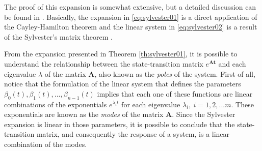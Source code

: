 \documentclass[a4paper,11pt]{book}
\numberwithin{figure}{chapter}
\numberwithin{equation}{chapter}
\numberwithin{table}{chapter}
\theoremstyle{definition}
\begin{document}
The proof of this expansion is somewhat extensive, but a detailed discussion can be found in \cite{Chen:1998}. Basically, the expansion in \eqref{eq:sylvester01} is a direct application of the Cayley-Hamilton theorem \cite{Atiyah:2018} and the linear system in \eqref{eq:sylvester02} is a result of the Sylvester's matrix theorem \cite{Horn:2012}.

From the expansion presented in Theorem \ref{th:sylvester01}, it is possible to understand the relationship between the state-transition matrix $e^{\bm{At}}$ and each eigenvalue $\lambda$ of the matrix $\bm{A}$, also known as the \textit{poles} of the system. First of all, notice that the formulation of the linear system that defines the parameters $\beta_0(t), \beta_1(t), ..., \beta_{n-1}(t)$ implies that each one of these functions are linear combinations of the exponentials $e^{\lambda_i t}$ for each eigenvalue $\lambda_i,\ i=1,2,...m$. These exponentials are known as the \textit{modes} of the matrix $\bm{A}$. Since the Sylvester expansion is linear in those parameters, it is possible to conclude that the state-transition matrix, and consequently the response of a system, is a linear combination of the modes.
\end{document}
